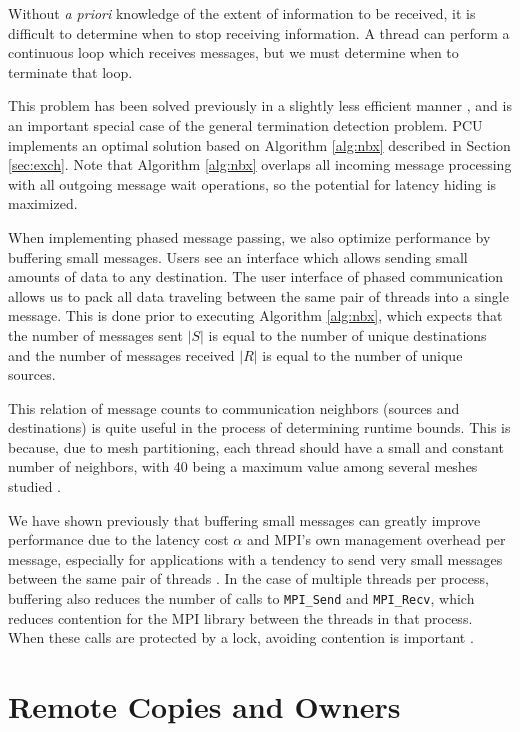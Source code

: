 Without {\it a priori} knowledge of the extent of information to be
received, it is difficult to determine when to stop receiving
information.
A thread can perform a continuous loop which receives messages,
but we must determine when to terminate that loop.

This problem has been solved previously in a slightly less efficient
manner \cite{ovcharenko2012neighborhood}, and is an important special case
of the general termination detection problem.
PCU implements an optimal solution based on Algorithm \ref{alg:nbx}
described in Section \ref{sec:exch}.
Note that Algorithm \ref{alg:nbx} overlaps all incoming message processing
with all outgoing message wait operations, so the potential for latency
hiding is maximized.

When implementing phased message passing, we also optimize performance
by buffering small messages.
Users see an interface which allows sending small amounts of data to
any destination.
The user interface of phased communication allows us to pack
all data traveling between the same pair of threads into a single message.
This is done prior to executing Algorithm \ref{alg:nbx}, which expects
that the number of messages sent $|S|$ is equal to the number of unique
destinations and the number of messages received $|R|$ is equal to the number
of unique sources.

This relation of message counts to communication neighbors (sources and
destinations) is quite useful in the process of determining runtime bounds.
This is because, due to mesh partitioning, each thread should have a small
and constant number of neighbors, with 40 being a maximum value among
several meshes studied \cite{zhou2010petascale}.

We have shown previously that buffering small messages can greatly improve performance
due to the latency cost $\alpha$ and MPI's own management overhead per message,
especially for applications
with a tendency to send very small messages between the same pair of threads
\cite{ovcharenko2012neighborhood}.
In the case of multiple threads per process, buffering also reduces
the number of calls to \texttt{MPI\_Send} and \texttt{MPI\_Recv}, which reduces
contention for the MPI library between the threads in that process.
When these calls are protected by a lock, avoiding contention is important
\cite{mavriplis2002parallel}.

\section{Remote Copies and Owners}
\label{sec:remotes}

